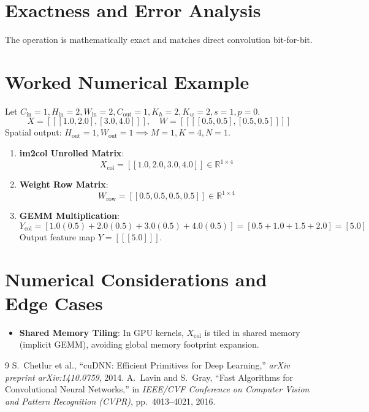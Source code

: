 \documentclass[11pt,a4paper]{article}
\theoremstyle{definition}
\begin{document}
\section{Exactness and Error Analysis}

The operation is mathematically exact and matches direct convolution bit-for-bit.

\section{Worked Numerical Example}

Let $C_{\text{in}} = 1, H_{\text{in}} = 2, W_{\text{in}} = 2, C_{\text{out}} = 1, K_h = 2, K_w = 2, s = 1, p = 0$.
\begin{equation}
X = [[[1.0, 2.0], [3.0, 4.0]]], \quad W = [[[[0.5, 0.5], [0.5, 0.5]]]]
\end{equation}
Spatial output: $H_{\text{out}} = 1, W_{\text{out}} = 1 \implies M = 1, K = 4, N = 1$.

\begin{enumerate}
    \item \textbf{im2col Unrolled Matrix}:
    \begin{equation}
    X_{\text{col}} = [[1.0, 2.0, 3.0, 4.0]] \in \mathbb{R}^{1 \times 4}
    \end{equation}
    \item \textbf{Weight Row Matrix}:
    \begin{equation}
    W_{\text{row}} = [[0.5, 0.5, 0.5, 0.5]] \in \mathbb{R}^{1 \times 4}
    \end{equation}
    \item \textbf{GEMM Multiplication}:
    \begin{equation}
    Y_{\text{col}} = [1.0(0.5) + 2.0(0.5) + 3.0(0.5) + 4.0(0.5)] = [0.5 + 1.0 + 1.5 + 2.0] = [5.0]
    \end{equation}
    Output feature map $Y = [[[5.0]]]$.
\end{enumerate}

\section{Numerical Considerations and Edge Cases}

\begin{itemize}
    \item \textbf{Shared Memory Tiling}: In GPU kernels, $X_{\text{col}}$ is tiled in shared memory (implicit GEMM), avoiding global memory footprint expansion.
\end{itemize}

\begin{thebibliography}{9}
 S.~Chetlur et al., ``cuDNN: Efficient Primitives for Deep Learning,'' \emph{arXiv preprint arXiv:1410.0759}, 2014.
 A.~Lavin and S.~Gray, ``Fast Algorithms for Convolutional Neural Networks,'' in \emph{IEEE/CVF Conference on Computer Vision and Pattern Recognition (CVPR)}, pp.~4013--4021, 2016.
\end{thebibliography}
\end{document}
